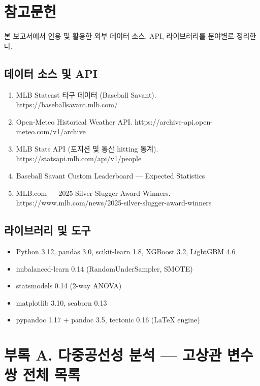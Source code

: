 \documentclass[
  11.5pt,
]{article}
\providecommand{\tightlist}{%
  \setlength{\itemsep}{0pt}\setlength{\parskip}{0pt}}
\begin{document}
\section{참고문헌}\label{uxcc38uxace0uxbb38uxd5cc}

본 보고서에서 인용 및 활용한 외부 데이터 소스, API, 라이브러리를
분야별로 정리한다.

\subsection{데이터 소스 및
API}\label{uxb370uxc774uxd130-uxc18cuxc2a4-uxbc0f-api}

\begin{enumerate}
\def\labelenumi{\arabic{enumi}.}
\tightlist
\item
  MLB Statcast 타구 데이터 (Baseball Savant).
  https://baseballsavant.mlb.com/
\item
  Open-Meteo Historical Weather API.
  https://archive-api.open-meteo.com/v1/archive
\item
  MLB Stats API (포지션 및 통산 hitting 통계).
  https://statsapi.mlb.com/api/v1/people
\item
  Baseball Savant Custom Leaderboard --- Expected Statistics
\item
  MLB.com --- 2025 Silver Slugger Award Winners.
  https://www.mlb.com/news/2025-silver-slugger-award-winners
\end{enumerate}

\subsection{라이브러리 및
도구}\label{uxb77cuxc774uxbe0cuxb7ecuxb9ac-uxbc0f-uxb3c4uxad6c}

\begin{itemize}
\tightlist
\item
  Python 3.12, pandas 3.0, scikit-learn 1.8, XGBoost 3.2, LightGBM 4.6
\item
  imbalanced-learn 0.14 (RandomUnderSampler, SMOTE)
\item
  statsmodels 0.14 (2-way ANOVA)
\item
  matplotlib 3.10, seaborn 0.13
\item
  pypandoc 1.17 + pandoc 3.5, tectonic 0.16 (LaTeX engine)
\end{itemize}

\section*{부록 A. 다중공선성 분석 --- 고상관 변수 쌍 전체
목록}\label{uxbd80uxb85d-a.-uxb2e4uxc911uxacf5uxc120uxc131-uxbd84uxc11d-uxace0uxc0c1uxad00-uxbcc0uxc218-uxc30d-uxc804uxccb4-uxbaa9uxb85d}
\end{document}
